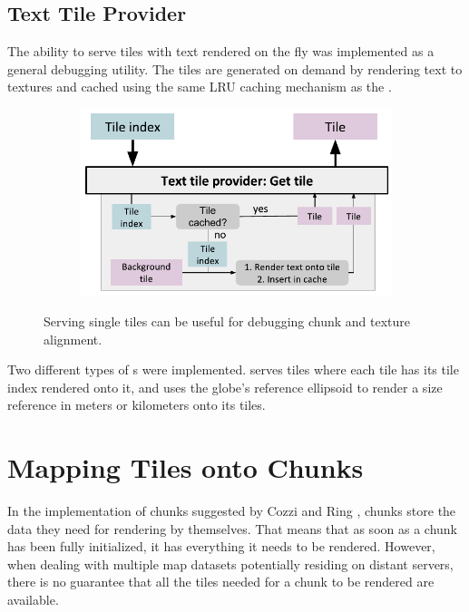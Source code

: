 \subsection{Text Tile Provider}
The ability to serve tiles with text rendered on the fly was implemented as a general debugging utility. The tiles are generated on demand by rendering text to textures and cached using the same LRU caching mechanism as the .

\begin{figure}[htbp]
    \centering
    \begin{subfigure}[bt]{0.6\textwidth}
        \includegraphics[width=\textwidth]{figures/implementation/tileprovider/texttileprovider_gettile.pdf}
    \end{subfigure}
    \caption{Serving single tiles can be useful for debugging chunk and texture alignment.}
    \label{fig:texttileprovider_gettile}
\end{figure}

Two different types of s were implemented.  serves tiles where each tile has its tile index rendered onto it, and  uses the globe's reference ellipsoid to render a size reference in meters or kilometers onto its tiles.


\section{Mapping Tiles onto Chunks}
  
In the implementation of chunks suggested by Cozzi and Ring \cite{cozzi11}, chunks store the data they need for rendering by themselves. That means that as soon as a chunk has been fully initialized, it has everything it needs to be rendered. However, when dealing with multiple map datasets potentially residing on distant servers, there is no guarantee that all the tiles needed for a chunk to be rendered are available.

